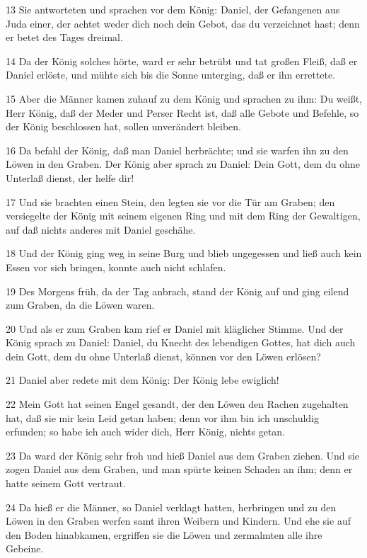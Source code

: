 \par 13 Sie antworteten und sprachen vor dem König: Daniel, der Gefangenen aus Juda einer, der achtet weder dich noch dein Gebot, das du verzeichnet hast; denn er betet des Tages dreimal.
\par 14 Da der König solches hörte, ward er sehr betrübt und tat großen Fleiß, daß er Daniel erlöste, und mühte sich bis die Sonne unterging, daß er ihn errettete.
\par 15 Aber die Männer kamen zuhauf zu dem König und sprachen zu ihm: Du weißt, Herr König, daß der Meder und Perser Recht ist, daß alle Gebote und Befehle, so der König beschlossen hat, sollen unverändert bleiben.
\par 16 Da befahl der König, daß man Daniel herbrächte; und sie warfen ihn zu den Löwen in den Graben. Der König aber sprach zu Daniel: Dein Gott, dem du ohne Unterlaß dienst, der helfe dir!
\par 17 Und sie brachten einen Stein, den legten sie vor die Tür am Graben; den versiegelte der König mit seinem eigenen Ring und mit dem Ring der Gewaltigen, auf daß nichts anderes mit Daniel geschähe.
\par 18 Und der König ging weg in seine Burg und blieb ungegessen und ließ auch kein Essen vor sich bringen, konnte auch nicht schlafen.
\par 19 Des Morgens früh, da der Tag anbrach, stand der König auf und ging eilend zum Graben, da die Löwen waren.
\par 20 Und als er zum Graben kam rief er Daniel mit kläglicher Stimme. Und der König sprach zu Daniel: Daniel, du Knecht des lebendigen Gottes, hat dich auch dein Gott, dem du ohne Unterlaß dienst, können vor den Löwen erlösen?
\par 21 Daniel aber redete mit dem König: Der König lebe ewiglich!
\par 22 Mein Gott hat seinen Engel gesandt, der den Löwen den Rachen zugehalten hat, daß sie mir kein Leid getan haben; denn vor ihm bin ich unschuldig erfunden; so habe ich auch wider dich, Herr König, nichts getan.
\par 23 Da ward der König sehr froh und hieß Daniel aus dem Graben ziehen. Und sie zogen Daniel aus dem Graben, und man spürte keinen Schaden an ihm; denn er hatte seinem Gott vertraut.
\par 24 Da hieß er die Männer, so Daniel verklagt hatten, herbringen und zu den Löwen in den Graben werfen samt ihren Weibern und Kindern. Und ehe sie auf den Boden hinabkamen, ergriffen sie die Löwen und zermalmten alle ihre Gebeine.
